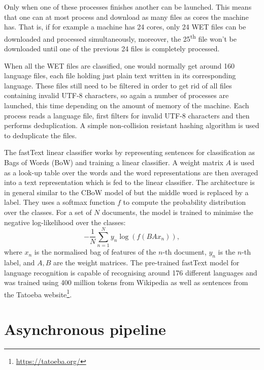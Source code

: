 Only when one of these processes finishes another can be launched. This means that one can at most process and download as many files as cores the machine has. That is, if for example a machine has 24 cores, only 24 WET files can be downloaded and processed simultaneously, moreover, the 25\textsuperscript{th} file won't be downloaded until one of the previous 24 files is completely processed.

When all the WET files are classified, one would normally get around 160 language files, each file holding just plain text written in its corresponding language. These files still need to be filtered in order to get rid of all files containing invalid UTF-8 characters, so again a number of processes are launched, this time depending on the amount of memory of the machine. Each process reads a language file, first filters for invalid UTF-8 characters and then performs deduplication. A simple non-collision resistant hashing algorithm is used to deduplicate the files.

The fastText linear classifier works by representing sentences for classification as Bags of Words (BoW) and training a linear classifier. A weight matrix $A$ is used as a look-up table over the words and the word representations are then averaged into a text representation which is fed to the linear classifier. The architecture is in general similar to the CBoW model of \citet{mikolov-etal-2013-distributed} but the middle word is replaced by a label. They uses a softmax function $f$ to compute the probability distribution over the classes. For a set of $N$ documents, the model is trained to minimise the negative log-likelihood over the classes:
\[
    -\frac{1}{N}\sum_{n=1}^{N} y_n\log\left(f(BAx_n)\right),
\]
where $x_n$ is the normalised bag of features of the $n$-th document, $y_n$ is the $n$-th label, and $A,B$ are the weight matrices. The pre-trained fastText model for language recognition \citep{grave-etal-2018-learning} is capable of recognising around 176 different languages and was trained using 400 million tokens from Wikipedia as well as sentences from the Tatoeba website\footnote{\url{https://tatoeba.org/}}.

\section{Asynchronous pipeline}

